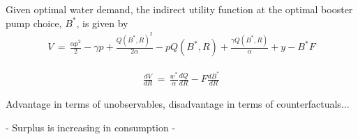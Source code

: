\documentclass[12pt,table]{article}
\begin{document}
Given optimal water demand, the indirect utility function at the optimal booster pump choice, $B^{*}$, is given by 
\begin{align}
V\,=\,\frac{\alpha p^2}{2} - \gamma p + \frac{Q(B^{*},R)^{2}}{2\alpha} - p Q(B^{*},R) + \frac{\gamma Q(B^{*},R)}{\alpha} + y - B^{*} F
\end{align}


\begin{align}
\label{eq:dvdr}
\frac{dV}{dR}\,=\,\frac{w^{*}}{\alpha} \frac{dQ}{dR} - F \frac{dB^{*}}{dR}
\end{align}

Advantage in terms of unobservables, disadvantage in terms of counterfactuals...

- Surplus is increasing in consumption
- 

\end{document}
